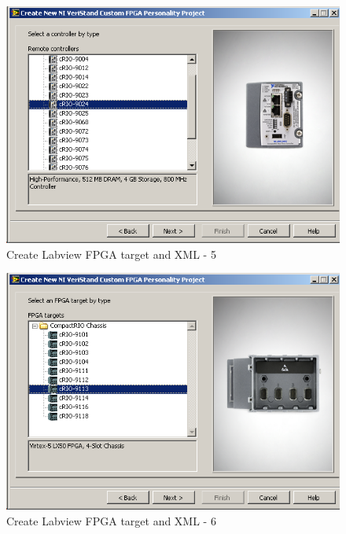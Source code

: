 \begin{figure}[htb!]
	\centering \includegraphics[scale=0.45]{Screenshots/Screenshot_2015-01-16_19-24-31.png}
	\caption{Create Labview FPGA target and XML - 5}
	\label{fig: Create Labview FPGA target and XML-5} 
\end{figure}
\begin{figure}[htb!]
	\centering \includegraphics[scale=0.45]{Screenshots/Screenshot_2015-01-16_19-24-43.png}
	\caption{Create Labview FPGA target and XML - 6}
	\label{fig: Create Labview FPGA target and XML-6} 
\end{figure}
